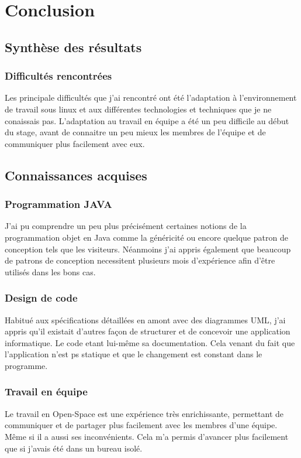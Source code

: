 \chapter{Conclusion}





\section{Synthèse des résultats}
\subsection{Difficultés rencontrées}
Les principale difficultés que j'ai rencontré ont été l'adaptation à l'environnement de travail sous linux et aux différentes technologies et techniques que je ne conaissais pas.
L'adaptation au travail en équipe a été un peu difficile au début du stage, avant de connaitre un peu mieux les membres de l'équipe et de communiquer plus facilement avec eux.
\section{Connaissances acquises}
\subsection{Programmation JAVA}
J'ai pu comprendre un peu plus précisément certaines notions de la programmation objet en Java comme la généricité ou encore quelque patron de conception tels que les visiteurs. Néanmoins j'ai appris également que beaucoup de patrons de conception necessitent plusieurs mois d'expérience afin d'être utilisés dans les bons cas.
\subsection{Design de code}
Habitué aux spécifications détaillées en amont avec des diagrammes UML, j'ai appris qu'il existait d'autres façon de structurer et de concevoir une application informatique. Le code etant lui-même sa documentation. Cela venant du fait que l'application n'est ps statique et que le changement est constant dans le programme.
\subsection{Travail en équipe}
Le travail en Open-Space est une expérience très enrichissante, permettant de communiquer et de partager plus facilement avec les membres d'une équipe. Même si il a aussi ses inconvénients. Cela m'a permis d'avancer plus facilement que si j'avais été dans un bureau isolé.

